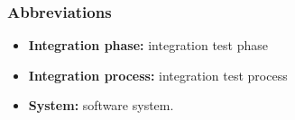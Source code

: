 \subsubsection{Abbreviations}

\begin{itemize}
	\item \textbf{Integration phase:} integration test phase
	\item \textbf{Integration process:} integration test process
	\item \textbf{System:} software system.
\end{itemize}
